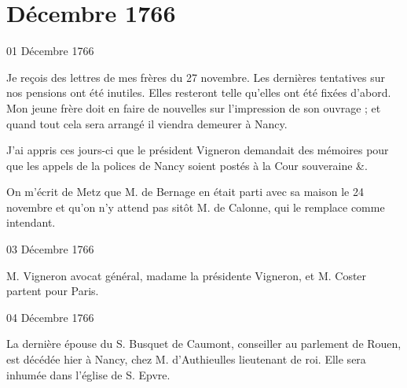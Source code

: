                   \chapter*{Décembre 1766}


                     \begin{diary}{01 Décembre 1766}{}

                         Je reçois des lettres de mes
                              frères du
                           27 novembre. Les dernières
                           tentatives
                           sur nos pensions ont été inutiles. Elles
                           resteront telle qu’elles ont été fixées d’abord.
                           Mon jeune frère doit
                           en faire de nouvelles
                           sur l’impression de son ouvrage ; et quand
                           tout cela sera arrangé il viendra demeurer
                           à Nancy. \bigskip


                         J’ai appris ces jours-ci que le président
                              Vigneron demandait des mémoires pour
                           que les appels de la polices de Nancy
                           soient
                           postés à la Cour souveraine \&. \bigskip


                         On m’écrit de Metz que M. de
                              Bernage
                           en était parti avec sa maison le 24
                              novembre et qu’on n’y attend pas sitôt M.
                              de Calonne, qui le remplace comme intendant. \bigskip


                     \end{diary}

                     \begin{diary}{03 Décembre 1766}{}


                           M. Vigneron avocat
                           général, madame la présidente
                              Vigneron, et M.
                              Coster partent pour Paris. \bigskip


                     \end{diary}

                     \begin{diary}{04 Décembre 1766}{}


                           La dernière épouse du S. Busquet de Caumont,
                           conseiller au parlement de
                              Rouen, est décédée
                           hier à Nancy, chez
                           M. d’Authieulles
                           lieutenant de
                           roi. Elle sera inhumée dans l’église
                              de S. Epvre.
                        \bigskip


                     \end{diary}



